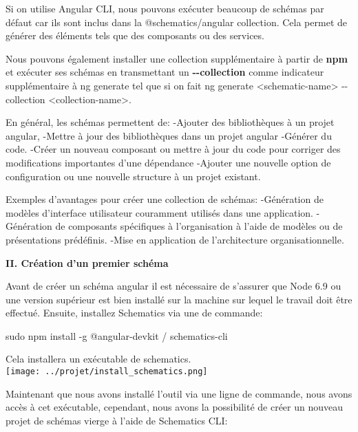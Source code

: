 \documentclass[12pt,french]{article}
\begin{document}
	Si on utilise Angular CLI, nous pouvons exécuter beaucoup de schémas par défaut car ils sont inclus dans la @schematics/angular collection. Cela permet de générer des éléments tels que des composants ou des services.\newline
	
	Nous pouvons également installer une collection supplémentaire à partir de \textbf{npm} et exécuter ses schémas en transmettant un \textbf{\--\--collection} comme indicateur supplémentaire à ng generate tel que si on fait ng generate <schematic-name> \--\--collection <collection-name>.\newline
	
	En général, les schémas permettent de:\smallbreak
		\quad-Ajouter des bibliothèques à un projet angular,\smallbreak
		\quad-Mettre à jour des bibliothèques dans un projet angular\smallbreak
		\quad-Générer du code.\smallbreak
		\quad-Créer un nouveau composant ou mettre à jour du code pour corriger des modifications 		importantes d'une dépendance\smallbreak
		\quad-Ajouter une nouvelle option de configuration ou une nouvelle structure à un projet existant.\newline
		
	 Exemples d'avantages pour créer une collection de schémas:\smallbreak
	\quad-Génération de modèles d'interface utilisateur couramment utilisés dans une application.\smallbreak
	\quad-Génération de composants spécifiques à l'organisation à l'aide de modèles ou de 	présentations prédéfinis.\smallbreak
	\quad-Mise en application de l'architecture organisationnelle.
\newline

	\textbf{II. Création d'un premier schéma}\newline
	
	Avant de créer un schéma angular il est nécessaire de s'assurer que Node 6.9 ou une version supérieur est bien installé sur la machine sur lequel le travail doit être effectué. 
	Ensuite, installez Schematics via une de commande:
\newline
	
	\qquad sudo npm install -g @angular-devkit / schematics-cli \newline
	
	Cela installera un exécutable de schematics.\newline
	\\
	\texttt{[image: ../projet/install\_schematics.png]} 
	
	Maintenant que nous avons installé l'outil via une ligne de commande, nous avons accès à cet exécutable, cependant, nous avons la possibilité de créer un nouveau projet de schémas vierge à l'aide de Schematics CLI:\newline
	
\end{document}
